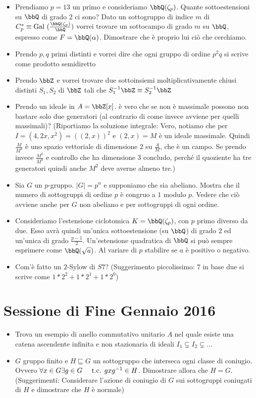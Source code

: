 \documentclass[a4paper,11pt,NoNotes,GeneralMath]{stdmdoc}
\newcommand{\sgr}{\sqsubseteq}
\newcommand{\Gal}{\text{Gal }}
\begin{document}
\begin{itemize}
        \item Prendiamo $p=13$ un primo e consideriamo $\bbQ(\zeta_p)$. Quante sottoestensioni su $\bbQ$ di grado 2 ci sono? Dato un sottogruppo di indice $m$ di $C_p^{*} \equiv \Gal(\frac{\bbQ(\zeta_p)}{\bbQ})$ vorrei trovare un sottocampo di grado $m$ su $\bbQ$, espresso come $F = \bbQ(\alpha)$. Dimostrare che è proprio lui ciò che cerchiamo.
        \item Prendo $p, q$ primi distinti e vorrei dire che ogni gruppo di ordine $p^2 q$ si scrive come prodotto semidiretto
        \item Prendo $\bbZ$ e vorrei trovare due sottoinsiemi moltiplicativamente chiusi distinti $S_1, S_2$ di $\bbZ$ tali che $S_1^{-1} \bbZ \equiv S_2^{-1} \bbZ$
        \item Prendo un ideale in $A = \bbZ [x]$. è vero che se non è massimale possono non bastare solo due generatori (al contrario di come invece avviene per quelli massimali)? (Riportiamo la soluzione integrale: Vero, notiamo che per $I = (4, 2x, x^2) = ((2, x))^2 $ e $(2, x) = M$ è un ideale massimale. Quindi $\frac{M}{M^2}$ è uno spazio vettoriale di dimensione $2$ su $\frac{A}{M}$, che è un campo. Se prendo invece $\frac{M^2}{M^3}$ e controllo che ha dimensione 3 concludo, perché il quoziente ha tre generatori quindi anche $M^2$ deve averne almeno tre.)
		\item Sia $G$ un $p$-gruppo. $\mid G \mid = p^n$ e supponiamo che sia abeliano. Mostra che il numero di sottogruppi di ordine $p$ è congruo a $1$ modulo $p$. Vedere che ciò avviene anche per $G$ non abeliano e per sottogruppi di ogni ordine.
		\item Consideriamo l'estensione ciclotomica $K = \bbQ (\zeta_p)$, con $p$ primo diverso da due. Esso avrà quindi un'unica sottoestensione (su $\bbQ$) di grado $2$ ed un'unica di grado $\frac{p-1}{2}$. Un'estensione quadratica di $\bbQ$ si può sempre esprimere come $\bbQ(\sqrt{a})$. Al variare di $p$ stabilire se $a$ è positivo o negativo.
		\item Com'è fatto un $2$-Sylow di $S7$? (Suggerimento piccolissimo: $7$ in base due si scrive come $1*2^2 + 1 *2^1 + 1*2^0$)
	\end{itemize}
	
	\section*{Sessione di Fine Gennaio 2016}
	\begin{itemize}
		\item Trova un esempio di anello commutativo unitario $A$ nel quale esiste una catena ascendente infinita e non stazionaria di ideali $I_1 \subsetneq I_2 \subsetneq \ldots$
		\item $G$ gruppo finito e $H \sgr G$ un sottogruppo che interseca ogni classe di coniugio. Ovvero $\forall x \in G \exists g \in G \quad \mbox{ t.c. } gxg^{-1} \in H$. Dimostrare allora che $H = G$. (Suggerimenti: Considerare l'azione di coniugio di $G$ sui sottogruppi coniugati di $H$ e dimostrare che $H$ è normale)
    \end{itemize}
    
\end{document}
